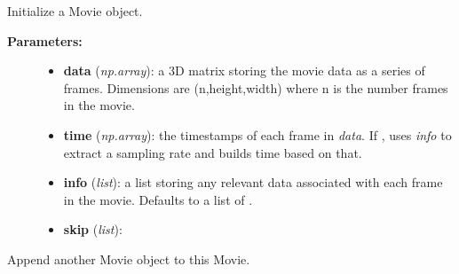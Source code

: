 \documentclass[letterpaper,10pt,english]{sphinxmanual}
\begin{document}
\begin{fulllineitems}
\begin{description}
\begin{itemize}
\end{itemize}

\end{description}

\begin{fulllineitems}
\label{data_structures:movies.Movie.__init__}
Initialize a Movie object.
\begin{description}
\item[{\textbf{Parameters:}}] \leavevmode\begin{itemize}
\item {} 
\textbf{data} (\emph{np.array}): a 3D matrix storing the movie data as a series of frames. Dimensions are (n,height,width) where n is the number frames in the movie.

\item {} 
\textbf{time} (\emph{np.array}): the timestamps of each frame in \emph{data}. If , uses \emph{info} to extract a sampling rate and builds time based on that.

\item {} 
\textbf{info} (\emph{list}): a list storing any relevant data associated with each frame in the movie. Defaults to a list of .

\item {} 
\textbf{skip} (\emph{list}): 

\end{itemize}

\end{description}

\end{fulllineitems}


\begin{fulllineitems}
\label{data_structures:movies.Movie.append}
Append another Movie object to this Movie.

\end{fulllineitems}



\end{fulllineitems}
\end{document}
